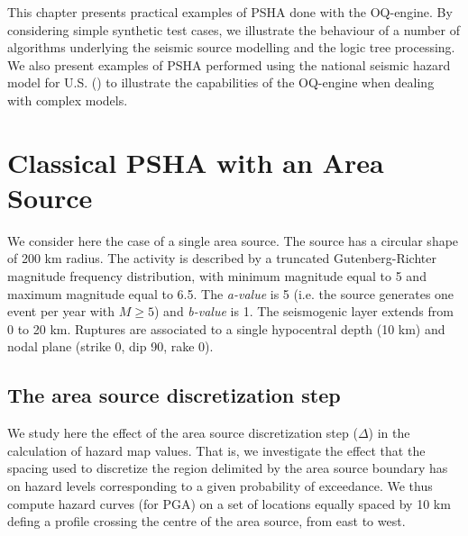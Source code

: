 This chapter presents practical examples of PSHA done with the OQ-engine. By considering simple synthetic test cases, we illustrate the behaviour of a number of algorithms underlying the seismic source modelling
and the logic tree processing. We also present examples of PSHA performed using the national seismic hazard model for U.S. (\cite{petersen2008}) to illustrate the capabilities of the OQ-engine when dealing with complex
models.

\section{Classical PSHA with an Area Source}
We consider here the case of a single area source. The source has a circular shape of 200 km radius. The activity
is described by a truncated Gutenberg-Richter magnitude frequency distribution, with minimum magnitude
equal to 5 and maximum magnitude equal to 6.5. The \textit{a-value} is 5 (i.e. the source generates one
event per year with $M \ge 5$) and \textit{b-value} is 1. The seismogenic layer extends from 0 to 20 km.
Ruptures are associated to a single hypocentral depth (10 km) and nodal plane (strike 0, dip 90, rake 0).

\subsection{The area source discretization step}
We study here the effect of the area source discretization step ($\Delta$) in the calculation of hazard map values. That is, we investigate the effect that the spacing used to discretize the region delimited by the area
source boundary has on hazard levels corresponding to a given probability of exceedance. We thus compute
hazard curves (for PGA) on a set of locations equally spaced by 10 km defing a profile crossing the centre of the area source, from east to west.

